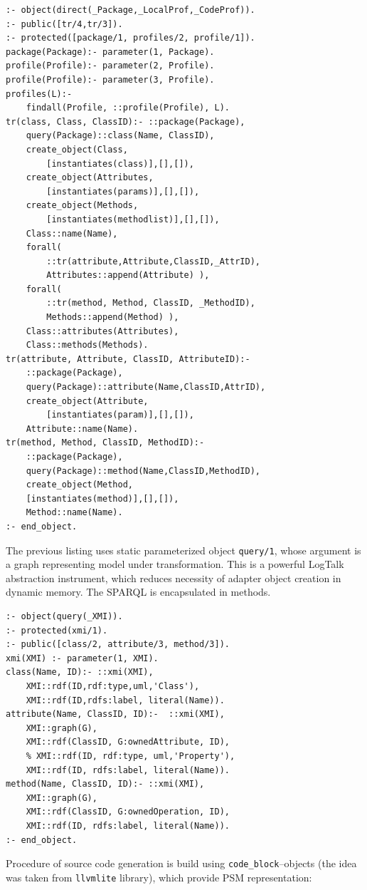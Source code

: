 \documentclass[conference]{IEEEtran}
\begin{document}
\begin{verbatim}
:- object(direct(_Package,_LocalProf,_CodeProf)).
:- public([tr/4,tr/3]).
:- protected([package/1, profiles/2, profile/1]).
package(Package):- parameter(1, Package).
profile(Profile):- parameter(2, Profile).
profile(Profile):- parameter(3, Profile).
profiles(L):-
    findall(Profile, ::profile(Profile), L).
tr(class, Class, ClassID):- ::package(Package),
    query(Package)::class(Name, ClassID),
    create_object(Class,
        [instantiates(class)],[],[]),
    create_object(Attributes,
        [instantiates(params)],[],[]),
    create_object(Methods,
        [instantiates(methodlist)],[],[]),
    Class::name(Name),
    forall(
        ::tr(attribute,Attribute,ClassID,_AttrID),
        Attributes::append(Attribute) ),
    forall(
        ::tr(method, Method, ClassID, _MethodID),
        Methods::append(Method) ),
    Class::attributes(Attributes),
    Class::methods(Methods).
tr(attribute, Attribute, ClassID, AttributeID):-
    ::package(Package),
    query(Package)::attribute(Name,ClassID,AttrID),
    create_object(Attribute,
        [instantiates(param)],[],[]),
    Attribute::name(Name).
tr(method, Method, ClassID, MethodID):-
    ::package(Package),
    query(Package)::method(Name,ClassID,MethodID),
    create_object(Method,
    [instantiates(method)],[],[]),
    Method::name(Name).
:- end_object.
\end{verbatim}

The previous listing uses static parameterized object \verb|query/1|, whose argument is a graph representing model under transformation.  This is a powerful LogTalk abstraction instrument, which reduces necessity of adapter object creation in dynamic memory.  The SPARQL is encapsulated in methods.

\begin{verbatim}
:- object(query(_XMI)).
:- protected(xmi/1).
:- public([class/2, attribute/3, method/3]).
xmi(XMI) :- parameter(1, XMI).
class(Name, ID):- ::xmi(XMI),
    XMI::rdf(ID,rdf:type,uml,'Class'),
    XMI::rdf(ID,rdfs:label, literal(Name)).
attribute(Name, ClassID, ID):-  ::xmi(XMI),
    XMI::graph(G),
    XMI::rdf(ClassID, G:ownedAttribute, ID),
    % XMI::rdf(ID, rdf:type, uml,'Property'),
    XMI::rdf(ID, rdfs:label, literal(Name)).
method(Name, ClassID, ID):- ::xmi(XMI),
    XMI::graph(G),
    XMI::rdf(ClassID, G:ownedOperation, ID),
    XMI::rdf(ID, rdfs:label, literal(Name)).
:- end_object.
\end{verbatim}

Procedure of source code generation is build using \verb|code_block|--objects (the idea was taken from \verb|llvmlite| library), which provide PSM representation:
\end{document}
